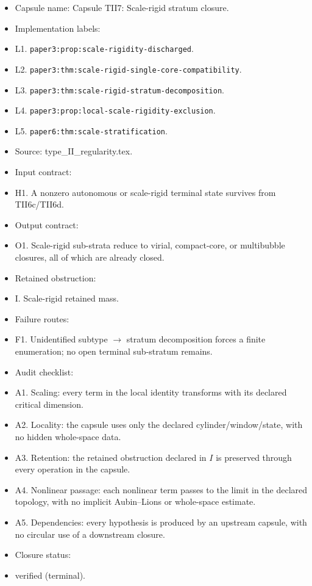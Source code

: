 \documentclass[11pt]{amsart}
\begin{document}
\begin{itemize}
  \item Capsule name: Capsule TII7: Scale-rigid stratum closure.
  \item Implementation labels:
  \item L1. \texttt{paper3:prop:scale-rigidity-discharged}.
  \item L2. \texttt{paper3:thm:scale-rigid-single-core-compatibility}.
  \item L3. \texttt{paper3:thm:scale-rigid-stratum-decomposition}.
  \item L4. \texttt{paper3:prop:local-scale-rigidity-exclusion}.
  \item L5. \texttt{paper6:thm:scale-stratification}.
  \item Source: type\_II\_regularity.tex.
  \item Input contract:
  \item H1. A nonzero autonomous or scale-rigid terminal state survives from TII6c/TII6d.
  \item Output contract:
  \item O1. Scale-rigid sub-strata reduce to virial, compact-core, or multibubble closures, all of which are already closed.
  \item Retained obstruction:
  \item I. Scale-rigid retained mass.
  \item Failure routes:
  \item F1. Unidentified subtype $\to$ stratum decomposition forces a finite enumeration; no open terminal sub-stratum remains.
  \item Audit checklist:
  \item A1. Scaling: every term in the local identity transforms with its declared critical dimension.
  \item A2. Locality: the capsule uses only the declared cylinder/window/state, with no hidden whole-space data.
  \item A3. Retention: the retained obstruction declared in $I$ is preserved through every operation in the capsule.
  \item A4. Nonlinear passage: each nonlinear term passes to the limit in the declared topology, with no implicit Aubin--Lions or whole-space estimate.
  \item A5. Dependencies: every hypothesis is produced by an upstream capsule, with no circular use of a downstream closure.
  \item Closure status:
  \item verified (terminal).
\end{itemize}
\end{document}
